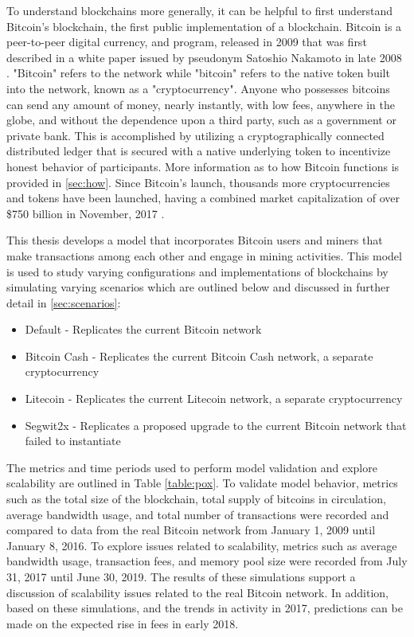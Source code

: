 \documentclass[12pt]{report}
\begin{document}
To understand blockchains more generally, it can be helpful to first understand Bitcoin's blockchain, the first public implementation of a blockchain. Bitcoin is a peer-to-peer digital currency, and program, released in 2009 that was first described in a white paper issued by pseudonym Satoshio Nakamoto in late 2008 \cite{Nakamoto.2008}. "Bitcoin" refers to the network while "bitcoin" refers to the native token built into the network, known as a "cryptocurrency". Anyone who possesses bitcoins can send any amount of money, nearly instantly, with low fees, anywhere in the globe, and without the dependence upon a third party, such as a government or private bank. This is accomplished by utilizing a cryptographically connected distributed ledger that is secured with a native underlying token to incentivize honest behavior of participants. More information as to how Bitcoin functions is provided in \autoref{sec:how}. Since Bitcoin's launch, thousands more cryptocurrencies and tokens have been launched, having a combined market capitalization of over \$750 billion in November, 2017 \cite{Coinmarketcap.com.2017}. 

This thesis develops a model that incorporates Bitcoin users and miners that make transactions among each other and engage in mining activities. This model is used to study varying configurations and implementations of blockchains by simulating varying scenarios which are outlined below and discussed in further detail in \autoref{sec:scenarios}:
\begin{itemize}
\item Default - Replicates the current Bitcoin network
\item Bitcoin Cash - Replicates the current Bitcoin Cash network, a separate cryptocurrency
\item Litecoin - Replicates the current Litecoin network, a separate cryptocurrency
\item Segwit2x - Replicates a proposed upgrade to the current Bitcoin network that failed to instantiate
\end{itemize}

The metrics and time periods used to perform model validation and explore scalability are outlined in Table \ref{table:pox}. To validate model behavior, metrics such as the total size of the blockchain, total supply of bitcoins in circulation, average bandwidth usage, and total number of transactions were recorded and compared to data from the real Bitcoin network from January 1, 2009 until January 8, 2016. To explore issues related to scalability, metrics such as average bandwidth usage, transaction fees, and memory pool size were recorded from July 31, 2017 until June 30, 2019. The results of these simulations support a discussion of scalability issues related to the real Bitcoin network. In addition, based on these simulations, and the trends in activity in 2017, predictions can be made on the expected rise in fees in early 2018. 
\end{document}
